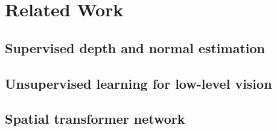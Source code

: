 \section{Related Work}

\subsection{Supervised depth and normal estimation}

\subsection{Unsupervised learning for low-level vision}

\subsection{Spatial transformer network}